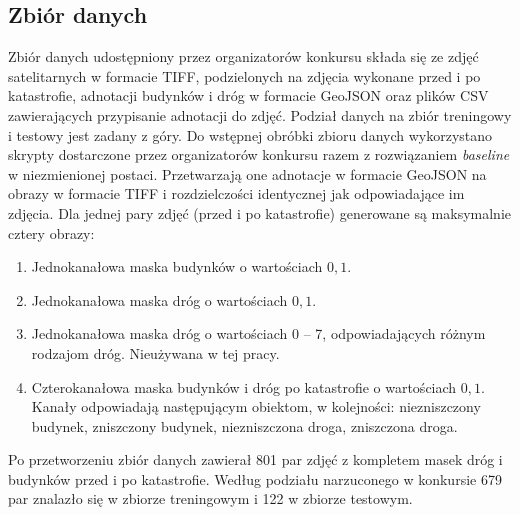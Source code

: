 \subsection{Zbiór danych}
Zbiór danych udostępniony przez organizatorów konkursu składa się ze zdjęć satelitarnych w formacie TIFF, podzielonych na zdjęcia wykonane przed i po katastrofie, adnotacji budynków i dróg w formacie GeoJSON oraz plików CSV zawierających przypisanie adnotacji do zdjęć. Podział danych na zbiór treningowy i testowy jest zadany z góry.
Do wstępnej obróbki zbioru danych wykorzystano skrypty dostarczone przez organizatorów konkursu razem z rozwiązaniem \textit{baseline} w niezmienionej postaci. Przetwarzają one adnotacje w formacie GeoJSON na obrazy w formacie TIFF i rozdzielczości identycznej jak odpowiadające im zdjęcia. Dla jednej pary zdjęć (przed i po katastrofie) generowane są maksymalnie cztery obrazy:
\begin{enumerate}
\item Jednokanałowa maska budynków o wartościach $0, 1$.
\item Jednokanałowa maska dróg o wartościach $0, 1$.
\item Jednokanałowa maska dróg o wartościach 0 -- 7, odpowiadających różnym rodzajom dróg. Nieużywana w tej pracy.
\item Czterokanałowa maska budynków i dróg po katastrofie o wartościach $0, 1$. Kanały odpowiadają następującym obiektom, w kolejności: niezniszczony budynek, zniszczony budynek, niezniszczona droga, zniszczona droga.
\end{enumerate}
Po przetworzeniu zbiór danych zawierał 801 par zdjęć z kompletem masek dróg i budynków przed i po katastrofie. Według podziału narzuconego w konkursie 679 par znalazło się w zbiorze treningowym i 122 w zbiorze testowym.\\

